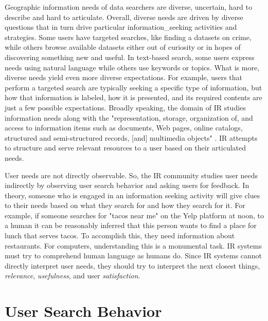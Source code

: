 Geographic information needs of data searchers are diverse, uncertain, hard to describe and hard to articulate. Overall, diverse needs are driven by diverse questions that in turn drive particular \gls{information_seeking} activities and strategies. Some users have targeted searches, like finding a datasets on crime, while others browse available datasets either out of curiosity or in hopes of discovering something new and useful. In text-based search, some users express needs using natural language while others use keywords or topics. What is more, diverse needs yield even more diverse expectations. For example, users that perform a targeted search are typically seeking a specific type of information, but how that information is labeled, how it is presented, and its required contents are just a few possible expectations. Broadly speaking, the domain of IR studies information needs along with the "representation, storage, organization of, and access to information items such as documents, Web pages, online catalogs, structured and semi-structured records, [and] multimedia objects" \cite{Baeza-Yates1999}. IR attempts to structure and serve relevant resources to a user based on their articulated needs. 

User needs are not directly observable. So, the IR community studies user needs indirectly by observing user search behavior and asking users for feedback. In theory, someone who is engaged in an information seeking activity will give clues to their needs based on what they search for and how they search for it. For example, if someone searches for "tacos near me" on the Yelp platform at noon, to a human it can be reasonably inferred that this person wants to find a place for lunch that serves tacos. To accomplish this, they need information about restaurants. For computers, understanding this is a monumental task. IR systems must try to comprehend human language as humans do. Since IR systems cannot directly interpret user needs, they should try to interpret the next closest things, \emph{relevance}, \emph{usefulness}, and user \emph{satisfaction}.

\section{User Search Behavior}

